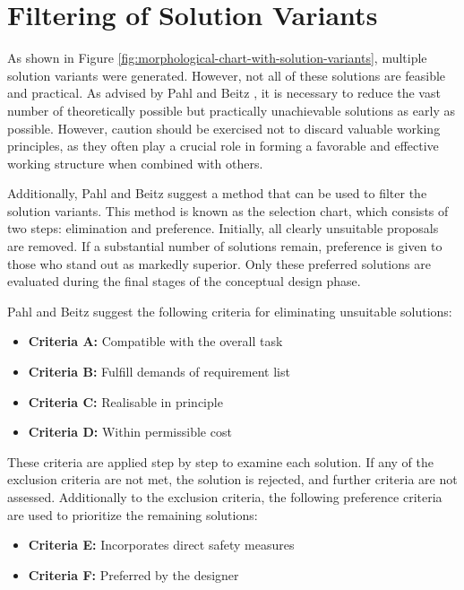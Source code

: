 \section{Filtering of Solution Variants}
\label{sec:filtering-of-solution-variants}
As shown in Figure \ref{fig:morphological-chart-with-solution-variants}, multiple solution variants were generated. However, not all of these solutions are feasible and practical. As advised by Pahl and Beitz \cite[106-107]{Pahl2007}, it is necessary to reduce the vast number of theoretically possible but practically unachievable solutions as early as possible. However, caution should be exercised not to discard valuable working principles, as they often play a crucial role in forming a favorable and effective working structure when combined with others.

Additionally, Pahl and Beitz \cite[107]{Pahl2007} suggest a method that can be used to filter the solution variants. This method is known as the selection chart, which consists of two steps: elimination and preference. Initially, all clearly unsuitable proposals are removed. If a substantial number of solutions remain, preference is given to those who stand out as markedly superior. Only these preferred solutions are evaluated during the final stages of the conceptual design phase.

Pahl and Beitz suggest the following criteria for eliminating unsuitable solutions:
\begin{itemize}
    \item \textbf{Criteria A:} Compatible with the overall task
    \item \textbf{Criteria B:} Fulfill demands of requirement list
    \item \textbf{Criteria C:} Realisable in principle
    \item \textbf{Criteria D:} Within permissible cost
\end{itemize}

These criteria are applied step by step to examine each solution. If any of the exclusion criteria are not met, the solution is rejected, and further criteria are not assessed. Additionally to the exclusion criteria, the following preference criteria are used to prioritize the remaining solutions:

\begin{itemize}
    \item \textbf{Criteria E:} Incorporates direct safety measures
    \item \textbf{Criteria F:} Preferred by the designer
\end{itemize}

